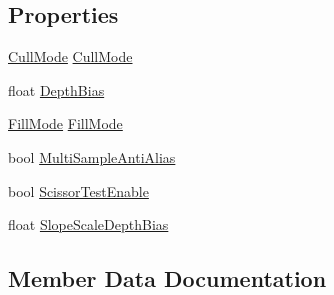 \subsection*{Properties}
\begin{DoxyCompactItemize}
\item 
\hyperlink{namespaceMicrosoft_1_1Xna_1_1Framework_1_1Graphics_a9602dcbc7b9991767e322a6f55541e8a}{Cull\+Mode} \hyperlink{classMicrosoft_1_1Xna_1_1Framework_1_1Graphics_1_1RasterizerState_a3d6df11839d897b774bba5a2dbfbd849}{Cull\+Mode}
\item 
float \hyperlink{classMicrosoft_1_1Xna_1_1Framework_1_1Graphics_1_1RasterizerState_a7b7f81baaf0464425ea3d52a08e1bc4c}{Depth\+Bias}
\item 
\hyperlink{namespaceMicrosoft_1_1Xna_1_1Framework_1_1Graphics_a75a9acd74effffae38daed55136b0980}{Fill\+Mode} \hyperlink{classMicrosoft_1_1Xna_1_1Framework_1_1Graphics_1_1RasterizerState_a0da685ba86799f79b9c37c2a8b5dd87a}{Fill\+Mode}
\item 
bool \hyperlink{classMicrosoft_1_1Xna_1_1Framework_1_1Graphics_1_1RasterizerState_a8abf14a37db429a17a46b2a993a887f2}{Multi\+Sample\+Anti\+Alias}
\item 
bool \hyperlink{classMicrosoft_1_1Xna_1_1Framework_1_1Graphics_1_1RasterizerState_a53a1dee6c9203ab7d9795b3e56c35cb5}{Scissor\+Test\+Enable}
\item 
float \hyperlink{classMicrosoft_1_1Xna_1_1Framework_1_1Graphics_1_1RasterizerState_a3da8181c9544730ff69b5593477d680f}{Slope\+Scale\+Depth\+Bias}
\end{DoxyCompactItemize}


\subsection{Member Data Documentation}
\hypertarget{classMicrosoft_1_1Xna_1_1Framework_1_1Graphics_1_1RasterizerState_abef271c00fb63c23307e13144e40f563}{}

